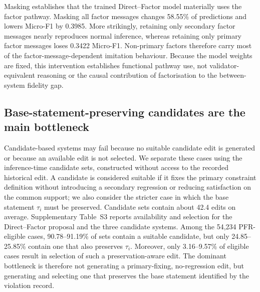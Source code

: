 \documentclass[a4paper,UKenglish,cleveref,autoref,thm-restate]{tgdk-v2021}
\begin{document}
\begin{table}[h]
\caption{Direct--Factor GNN inference-time factor-message masking results.}
\label{tab:factor-message-masking}
\centering
\small
{}
\end{table}

Masking establishes that the trained Direct--Factor model materially uses the factor pathway. Masking all factor messages changes 58.55\% of predictions and lowers Micro-F1 by 0.3985. More strikingly, retaining only secondary factor messages nearly reproduces normal inference, whereas retaining only primary factor messages loses 0.3422 Micro-F1. Non-primary factors therefore carry most of the factor-message-dependent imitation behaviour. Because the model weights are fixed, this intervention establishes functional pathway use, not validator-equivalent reasoning or the causal contribution of factorisation to the between-system fidelity gap.

\subsection{Base-statement-preserving candidates are the main bottleneck}
\label{subsec:candidate-oracle-results}

Candidate-based systems may fail because no suitable candidate edit is generated or because an available edit is not selected. We separate these cases using the inference-time candidate sets, constructed without access to the recorded historical edit. A candidate is considered suitable if it fixes the primary constraint definition without introducing a secondary regression or reducing satisfaction on the common support; we also consider the stricter case in which the base statement \(\tau_i\) must be preserved. Candidate sets contain about 42.4 edits on average. Supplementary Table~S3 reports availability and selection for the Direct--Factor proposal and the three candidate systems. Among the 54,234 PFR-eligible cases, 90.78--91.19\% of sets contain a suitable candidate, but only 24.85--25.85\% contain one that also preserves \(\tau_i\). Moreover, only 3.16--9.57\% of eligible cases result in selection of such a preservation-aware edit. The dominant bottleneck is therefore not generating a primary-fixing, no-regression edit, but generating and selecting one that preserves the base statement identified by the violation record.
\end{document}
